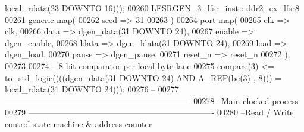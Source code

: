 \begin{DoxyCode}
{      local_rdata}\textcolor{vhdlchar}{(}\textcolor{vhdllogic}{}\textcolor{vhdllogic}{23} \textcolor{keywordflow}{DOWNTO} \textcolor{vhdllogic}{}\textcolor{vhdllogic}{16}\textcolor{vhdlchar}{)}\textcolor{vhdlchar}{)}\textcolor{vhdlchar}{)};
00260   LFSRGEN\_3\_lfsr\_inst : ddr2_ex_lfsr8
00261     \textcolor{keywordflow}{generic} \textcolor{keywordflow}{map}(
00262       seed => \textcolor{vhdllogic}{31}
00263     \textcolor{vhdlchar}{)}
00264     \textcolor{keywordflow}{port} \textcolor{keywordflow}{map}(
00265             clk => clk,
00266             data => dgen_data\textcolor{vhdlchar}{(}\textcolor{vhdllogic}{31} \textcolor{keywordflow}{DOWNTO} \textcolor{vhdllogic}{24}\textcolor{vhdlchar}{)},
00267             enable => dgen_enable,
00268             ldata => dgen_ldata\textcolor{vhdlchar}{(}\textcolor{vhdllogic}{31} \textcolor{keywordflow}{DOWNTO} \textcolor{vhdllogic}{24}\textcolor{vhdlchar}{)},
00269             load => dgen_load,
00270             pause => dgen_pause,
00271             reset_n => reset_n
00272     \textcolor{vhdlchar}{)};
00273 
00274 \textcolor{keyword}{  -- 8 bit comparator per local byte lane}
00275   \textcolor{vhdlchar}{compare}\textcolor{vhdlchar}{(}\textcolor{vhdllogic}{}\textcolor{vhdllogic}{3}\textcolor{vhdlchar}{)} \textcolor{vhdlchar}{<=} \textcolor{vhdlchar}{to\_std\_logic}\textcolor{vhdlchar}{(}\textcolor{vhdlchar}{(}\textcolor{vhdlchar}{(}\textcolor{vhdlchar}{(}\textcolor{vhdlchar}{dgen_data}\textcolor{vhdlchar}{(}\textcolor{vhdllogic}{}\textcolor{vhdllogic}{31} \textcolor{keywordflow}{DOWNTO} \textcolor{vhdllogic}{}\textcolor{vhdllogic}{24}\textcolor{vhdlchar}{)} \textcolor{keywordflow}{AND} \textcolor{vhdlchar}{A\_REP}\textcolor{vhdlchar}{(}\textcolor{vhdlchar}{be}\textcolor{vhdlchar}{(}\textcolor{vhdllogic}{}\textcolor{vhdllogic}{3}\textcolor{vhdlchar}{)} \textcolor{vhdlchar}{,} \textcolor{vhdllogic}{}\textcolor{vhdllogic}{8}\textcolor{vhdlchar}{)}\textcolor{vhdlchar}{)}\textcolor{vhdlchar}{)} \textcolor{vhdlchar}{=} \textcolor{vhdlchar}{
      local_rdata}\textcolor{vhdlchar}{(}\textcolor{vhdllogic}{}\textcolor{vhdllogic}{31} \textcolor{keywordflow}{DOWNTO} \textcolor{vhdllogic}{}\textcolor{vhdllogic}{24}\textcolor{vhdlchar}{)}\textcolor{vhdlchar}{)}\textcolor{vhdlchar}{)};
00276 \textcolor{keyword}{  --}
00277 \textcolor{keyword}{  -------------------------------------------------------------------}
00278 \textcolor{keyword}{  --Main clocked process}
00279 \textcolor{keyword}{  -------------------------------------------------------------------}
00280 \textcolor{keyword}{  --Read / Write control state machine & address counter}

\end{DoxyCode}
